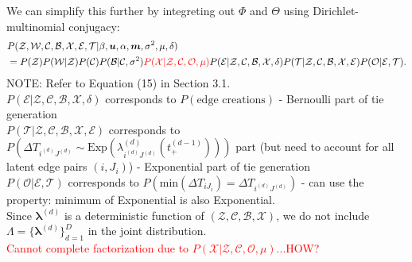 \documentclass[a4paper]{article}
\begin{document}
We can simplify this further by integreting out $\Phi$ and $\Theta$ using Dirichlet-multinomial conjugacy:
\begin{equation}
\begin{aligned}
&P(\mathcal{Z}, \mathcal{W}, \mathcal{C}, \mathcal{B},\mathcal{X}, \mathcal{E}, \mathcal{T}| \beta, \boldsymbol{u}, \alpha, \boldsymbol{m}, \sigma^2, \mu, \delta) \\& 
= P(\mathcal{Z})P(\mathcal{W}|\mathcal{Z}) P(\mathcal{C})P(\mathcal{B}|\mathcal{C}, \sigma^2)\textcolor{red}{P(\mathcal{X}|\mathcal{Z}, \mathcal{C}, \mathcal{O}, \mu)}
P(\mathcal{E}| \mathcal{Z}, \mathcal{C}, \mathcal{B}, \mathcal{X}, \delta)P(\mathcal{T}|\mathcal{Z}, \mathcal{C}, \mathcal{B}, \mathcal{X}, \mathcal{E})P(\mathcal{O}|\mathcal{E}, \mathcal{T}).
\end{aligned}
\end{equation}
NOTE: Refer to Equation (15) in Section 3.1. \\\newline$P(\mathcal{E}| \mathcal{Z}, \mathcal{C}, \mathcal{B}, \mathcal{X}, \delta)$ corresponds to $P(\mbox{edge creations})$ - Bernoulli part of tie generation\\\newline $P(\mathcal{T}|\mathcal{Z}, \mathcal{C}, \mathcal{B}, \mathcal{X}, \mathcal{E})$ corresponds to $P(\Delta T_{i^{(d)}J^{(d)}}\sim \mbox{Exp}(\lambda^{(d)}_{i^{(d)}{J^{(d)}}}(t_+^{(d-1)})))$ part (but need to account for all latent edge pairs $(i, J_i)$) - Exponential part of tie generation\\\newline
$P(\mathcal{O}|\mathcal{E}, \mathcal{T})$ corresponds to $P(\mbox{min}(\Delta T_{i{J_i}}) = \Delta T_{i^{(d)}{J^{(d)}}})$ - can use the property: minimum of Exponential is also Exponential. \\ \newline
Since $\boldsymbol{\lambda}^{(d)}$ is a deterministic function of $(\mathcal{Z}, \mathcal{C}, \mathcal{B}, \mathcal{X})$, we do not include $\Lambda=\{\boldsymbol{\lambda}^{(d)}\}_{d=1}^{D}$ in the joint distribution.\\ \newline
\textcolor{red} {Cannot complete factorization due to $P(\mathcal{X}|\mathcal{Z}, \mathcal{C}, \mathcal{O}, \mu)$...HOW?}
\end{document}
